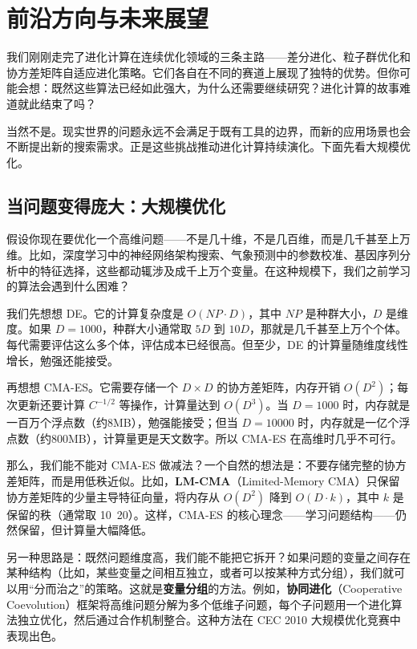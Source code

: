 \documentclass[lang=cn,zihao=-4,a4paper,fontset=windows]{beautybook}
\begin{document}
\section{前沿方向与未来展望}

我们刚刚走完了进化计算在连续优化领域的三条主路——差分进化、粒子群优化和协方差矩阵自适应进化策略。它们各自在不同的赛道上展现了独特的优势。但你可能会想：既然这些算法已经如此强大，为什么还需要继续研究？进化计算的故事难道就此结束了吗？

当然不是。现实世界的问题永远不会满足于既有工具的边界，而新的应用场景也会不断提出新的搜索需求。正是这些挑战推动进化计算持续演化。下面先看大规模优化。

\subsection{当问题变得庞大：大规模优化}

假设你现在要优化一个高维问题——不是几十维，不是几百维，而是几千甚至上万维。比如，深度学习中的神经网络架构搜索、气象预测中的参数校准、基因序列分析中的特征选择，这些都动辄涉及成千上万个变量。在这种规模下，我们之前学习的算法会遇到什么困难？

我们先想想 DE。它的计算复杂度是 $O(NP \cdot D)$，其中 $NP$ 是种群大小，$D$ 是维度。如果 $D=1000$，种群大小通常取 $5D$ 到 $10D$，那就是几千甚至上万个个体。每代需要评估这么多个体，评估成本已经很高。但至少，DE 的计算量随维度线性增长，勉强还能接受。

再想想 CMA-ES。它需要存储一个 $D \times D$ 的协方差矩阵，内存开销 $O(D^2)$；每次更新还要计算 $C^{-1/2}$ 等操作，计算量达到 $O(D^3)$。当 $D=1000$ 时，内存就是一百万个浮点数（约8MB），勉强能接受；但当 $D=10000$ 时，内存就是一亿个浮点数（约800MB），计算量更是天文数字。所以 CMA-ES 在高维时几乎不可行。

那么，我们能不能对 CMA-ES 做减法？一个自然的想法是：不要存储完整的协方差矩阵，而是用低秩近似。比如，\textbf{LM-CMA}（Limited-Memory CMA）只保留协方差矩阵的少量主导特征向量，将内存从 $O(D^2)$ 降到 $O(D \cdot k)$，其中 $k$ 是保留的秩（通常取 10~20）。这样，CMA-ES 的核心理念——学习问题结构——仍然保留，但计算量大幅降低。

另一种思路是：既然问题维度高，我们能不能把它拆开？如果问题的变量之间存在某种结构（比如，某些变量之间相互独立，或者可以按某种方式分组），我们就可以用“分而治之”的策略。这就是\textbf{变量分组}的方法。例如，\textbf{协同进化}（Cooperative Coevolution）框架将高维问题分解为多个低维子问题，每个子问题用一个进化算法独立优化，然后通过合作机制整合。这种方法在 CEC 2010 大规模优化竞赛中表现出色。
\end{document}
